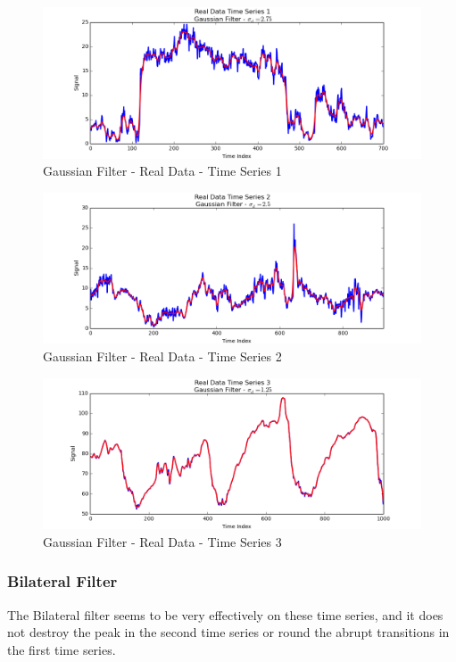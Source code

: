 \documentclass[11pt]{article}
\theoremstyle{definition}
\begin{document}
\begin{figure}
\centering
\includegraphics[width = 0.75 \textwidth]{GaussianRealSignal1.png}
\caption{Gaussian Filter - Real Data - Time Series 1}
\label{gaussianrealsignal1}
\end{figure}

\begin{figure}
\centering
\includegraphics[width = 0.75 \textwidth]{GaussianRealSignal2.png}
\caption{Gaussian Filter - Real Data - Time Series 2}
\label{gaussianrealsignal2}
\end{figure}

\begin{figure}
\centering
\includegraphics[width = 0.75 \textwidth]{GaussianRealSignal3.png}
\caption{Gaussian Filter - Real Data - Time Series 3}
\label{gaussianrealsignal3}
\end{figure}

\newpage

\subsubsection{Bilateral Filter}

The Bilateral filter seems to be very effectively on these time series, and it does not destroy the peak in the second time series or round the abrupt transitions in the first time series.
\end{document}
